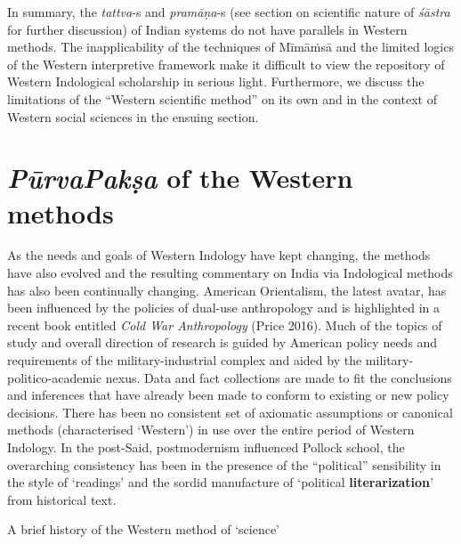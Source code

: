 In summary, the {\sl tattva}-s and {\sl pramāṇa}-s (see section on scientific nature of {\sl śāstra} for further discussion) of Indian systems do not have parallels in Western methods. The inapplicability of the techniques of Mīmāṁsā and the limited logics of the Western interpretive framework make it difficult to view the repository of Western Indological scholarship in serious light. Furthermore, we discuss the limitations of the ``Western scientific method'' on its own and in the context of Western social sciences in the ensuing section.

\section*{{{\sl\bfseries PūrvaPakṣa}\relax} of the Western methods}

As the needs and goals of Western Indology have kept changing, the methods have also evolved and the resulting commentary on India via Indological methods has also been continually changing. American Orientalism, the latest avatar, has been influenced by the policies of dual-use anthropology and is highlighted in a recent book entitled {\sl Cold War Anthropology} (Price 2016). Much of the topics of study and overall direction of research is guided by American policy needs and requirements of the military-industrial complex and aided by the military-politico-academic nexus. Data and fact collections are made to fit the conclusions and inferences that have already been made to conform to existing or new policy decisions. There has been no consistent set of axiomatic assumptions or canonical methods (characterised `Western') in use over the entire period of Western Indology. In the post-Said, postmodernism influenced Pollock school, the overarching consistency has been in the presence of the ``political'' sensibility in the style of `readings' and the sordid manufacture of `political {\bf literarization}' from historical text.

A brief history of the Western method of `science'

